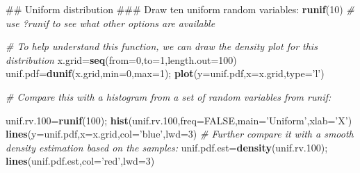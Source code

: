 \documentclass[12pt,]{book}
\newenvironment{Shaded}{\begin{snugshade}}{\end{snugshade}}
\newcommand{\KeywordTok}[1]{\textcolor[rgb]{0.13,0.29,0.53}{\textbf{#1}}}
\newcommand{\DataTypeTok}[1]{\textcolor[rgb]{0.13,0.29,0.53}{#1}}
\newcommand{\DecValTok}[1]{\textcolor[rgb]{0.00,0.00,0.81}{#1}}
\newcommand{\StringTok}[1]{\textcolor[rgb]{0.31,0.60,0.02}{#1}}
\newcommand{\CommentTok}[1]{\textcolor[rgb]{0.56,0.35,0.01}{\textit{#1}}}
\newcommand{\OtherTok}[1]{\textcolor[rgb]{0.56,0.35,0.01}{#1}}
\newcommand{\NormalTok}[1]{#1}
\begin{document}
\begin{Shaded}
\begin{Highlighting}[]
\NormalTok{## Uniform distribution}
\NormalTok{### Draw ten uniform random variables:}
\KeywordTok{runif}\NormalTok{(}\DecValTok{10}\NormalTok{)}
\CommentTok{# use ?runif to see what other options are available }

\CommentTok{# To help understand this function, we can draw the density plot for this distribution}
\NormalTok{x.grid=}\KeywordTok{seq}\NormalTok{(}\DataTypeTok{from=}\DecValTok{0}\NormalTok{,}\DataTypeTok{to=}\DecValTok{1}\NormalTok{,}\DataTypeTok{length.out=}\DecValTok{100}\NormalTok{)}
\NormalTok{unif.pdf=}\KeywordTok{dunif}\NormalTok{(x.grid,}\DataTypeTok{min=}\DecValTok{0}\NormalTok{,}\DataTypeTok{max=}\DecValTok{1}\NormalTok{);}
\KeywordTok{plot}\NormalTok{(}\DataTypeTok{y=}\NormalTok{unif.pdf,}\DataTypeTok{x=}\NormalTok{x.grid,}\DataTypeTok{type=}\StringTok{'l'}\NormalTok{)}

\CommentTok{# Compare this with a histogram from a set of random variables from runif:}

\NormalTok{unif.rv.}\DecValTok{100}\NormalTok{=}\KeywordTok{runif}\NormalTok{(}\DecValTok{100}\NormalTok{);}
\KeywordTok{hist}\NormalTok{(unif.rv.}\DecValTok{100}\NormalTok{,}\DataTypeTok{freq=}\OtherTok{FALSE}\NormalTok{,}\DataTypeTok{main=}\StringTok{'Uniform'}\NormalTok{,}\DataTypeTok{xlab=}\StringTok{'X'}\NormalTok{)}
\KeywordTok{lines}\NormalTok{(}\DataTypeTok{y=}\NormalTok{unif.pdf,}\DataTypeTok{x=}\NormalTok{x.grid,}\DataTypeTok{col=}\StringTok{'blue'}\NormalTok{,}\DataTypeTok{lwd=}\DecValTok{3}\NormalTok{)}
\CommentTok{# Further compare it with a smooth density estimation based on the samples:}
\NormalTok{unif.pdf.est=}\KeywordTok{density}\NormalTok{(unif.rv.}\DecValTok{100}\NormalTok{);}
\KeywordTok{lines}\NormalTok{(unif.pdf.est,}\DataTypeTok{col=}\StringTok{'red'}\NormalTok{,}\DataTypeTok{lwd=}\DecValTok{3}\NormalTok{)}
\end{Highlighting}
\end{Shaded}
\end{document}
